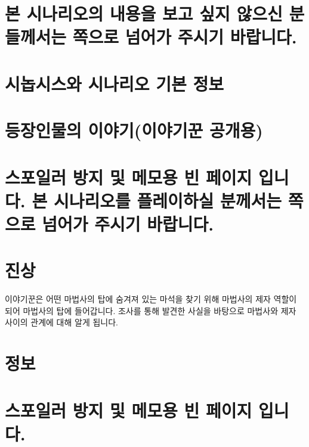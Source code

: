 \documentclass{report}
\begin{document}
	\chapter*{본 시나리오의 내용을 보고 싶지 않으신 분들께서는 \pageref{endof_Tower}쪽으로 넘어가 주시기 바랍니다.}
	
	\chapter{시놉시스와 시나리오 기본 정보}
	
	\chapter{등장인물의 이야기(이야기꾼 공개용)}
	
	\chapter*{스포일러 방지 및 메모용 빈 페이지 입니다. 본 시나리오를 플레이하실 분께서는 \pageref{endof_Unliving}쪽으로 넘어가 주시기 바랍니다.}
	
	\parttoc
	
	\chapter{진상}
		이야기꾼은 어떤 마법사의 탑에 숨겨져 있는 마석을 찾기 위해 마법사의 제자 역할이 되어 마법사의 탑에 들어갑니다. 조사를 통해 발견한 사실을 바탕으로 마법사와 제자 사이의 관계에 대해 알게 됩니다.
		
		
	
	\chapter{정보}
		
	\chapter*{스포일러 방지 및 메모용 빈 페이지 입니다.}
\end{document}
